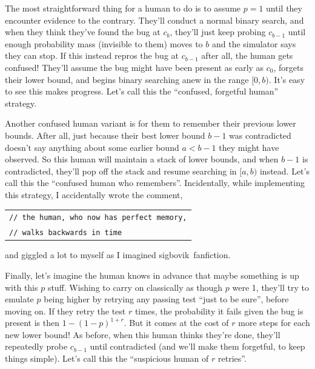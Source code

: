 \documentclass[11pt]{sigplanconf}
\begin{document}
The most straightforward thing for a human to do is to assume $p=1$ until they encounter evidence to the contrary.
They'll conduct a normal binary search, and when they think they've found the bug at $c_b$,
they'll just keep probing $c_{b-1}$ until enough probability mass (invisible to them)
moves to $b$ and the simulator says they can stop.
If this instead repros the bug at $c_{b-1}$ after all, the human gets confused!
They'll assume the bug might have been present as early as $c_0$,
forgets their lower bound, and begins binary searching anew in the range $[0,b)$.
It's easy to see this makes progress.
Let's call this the ``confused, forgetful human'' strategy.

Another confused human variant is for them to remember their previous lower bounds.
After all, just because their best lower bound $b-1$ was contradicted
doesn't say anything about some earlier bound $a<b-1$ they might have observed.
So this human will maintain a stack of lower bounds, and when $b-1$ is contradicted,
they'll pop off the stack and resume searching in $[a,b)$ instead.
Let's call this the ``confused human who remembers''.
%
Incidentally, while implementing this strategy, I accidentally wrote the comment,
\begin{center}
	\begin{tabular}{l}
		{\tt // the human, who now has perfect memory,} \\
		{\tt // walks backwards in time}
	\end{tabular}
\end{center}
and giggled a lot to myself as I imagined {\birbaslo sigbovik}~fanfiction.


Finally, let's imagine the human knows in advance that maybe something is up with this $p$ stuff.
Wishing to carry on classically as though $p$ were 1,
they'll try to emulate $p$ being higher by retrying any passing test ``just to be sure'', before moving on.
If they retry the test $r$ times,
the probability it fails given the bug is present is then $1-(1-p)^{1+r}$.
But it comes at the cost of $r$ more steps for each new lower bound!
As before, when this human thinks they're done, they'll repeatedly probe $c_{b-1}$ until contradicted
(and we'll make them forgetful, to keep things simple).
Let's call this the ``suspicious human of $r$ retries''.


\end{document}
